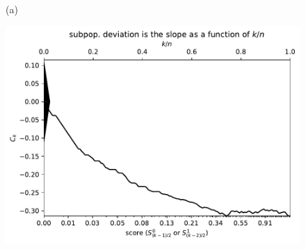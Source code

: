 \documentclass{article}
\newlength{\vertsep}
\newlength{\imsize}
\begin{document}
\begin{figure}
\begin{centering}

(a)
\parbox{\imsize}{\includegraphics[width=\imsize]
{../codes/unweighted/nll-1-60-night-snake-Hypsiglena-torquata_323-monarch-monarch-butterfly-milkweed-butterfly-Danaus-plexippus.pdf}}

\vspace{\vertsep}


\end{centering}
\end{figure}
\end{document}
